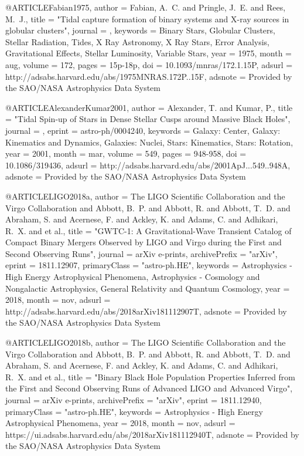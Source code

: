 \documentclass[twocolumn,tighten]{aastex63}
\begin{document}
{{{{@ARTICLE{Fabian1975,
   author = {{Fabian}, A.~C. and {Pringle}, J.~E. and {Rees}, M.~J.},
    title = "{Tidal capture formation of binary systems and X-ray sources in globular clusters}",
  journal = {\mnras},
 keywords = {Binary Stars, Globular Clusters, Stellar Radiation, Tides, X Ray Astronomy, X Ray Stars, Error Analysis, Gravitational Effects, Stellar Luminosity, Variable Stars},
     year = 1975,
    month = aug,
   volume = 172,
    pages = {15p-18p},
      doi = {10.1093/mnras/172.1.15P},
   adsurl = {http://adsabs.harvard.edu/abs/1975MNRAS.172P..15F},
  adsnote = {Provided by the SAO/NASA Astrophysics Data System}
}

@ARTICLE{AlexanderKumar2001,
   author = {{Alexander}, T. and {Kumar}, P.},
    title = "{Tidal Spin-up of Stars in Dense Stellar Cusps around Massive Black Holes}",
  journal = {\apj},
   eprint = {astro-ph/0004240},
 keywords = {Galaxy: Center, Galaxy: Kinematics and Dynamics, Galaxies: Nuclei, Stars: Kinematics, Stars: Rotation},
     year = 2001,
    month = mar,
   volume = 549,
    pages = {948-958},
      doi = {10.1086/319436},
   adsurl = {http://adsabs.harvard.edu/abs/2001ApJ...549..948A},
  adsnote = {Provided by the SAO/NASA Astrophysics Data System}
}

@ARTICLE{LIGO2018a,
   author = {{The LIGO Scientific Collaboration} and {the Virgo Collaboration} and 
	{Abbott}, B.~P. and {Abbott}, R. and {Abbott}, T.~D. and {Abraham}, S. and 
	{Acernese}, F. and {Ackley}, K. and {Adams}, C. and {Adhikari}, R.~X. and et al.},
    title = "{GWTC-1: A Gravitational-Wave Transient Catalog of Compact Binary Mergers Observed by LIGO and Virgo during the First and Second Observing Runs}",
  journal = {arXiv e-prints},
archivePrefix = "arXiv",
   eprint = {1811.12907},
 primaryClass = "astro-ph.HE",
 keywords = {Astrophysics - High Energy Astrophysical Phenomena, Astrophysics - Cosmology and Nongalactic Astrophysics, General Relativity and Quantum Cosmology},
     year = 2018,
    month = nov,
   adsurl = {http://adsabs.harvard.edu/abs/2018arXiv181112907T},
  adsnote = {Provided by the SAO/NASA Astrophysics Data System}
}

@ARTICLE{LIGO2018b,
   author = {{The LIGO Scientific Collaboration} and {the Virgo Collaboration} and 
	{Abbott}, B.~P. and {Abbott}, R. and {Abbott}, T.~D. and {Abraham}, S. and 
	{Acernese}, F. and {Ackley}, K. and {Adams}, C. and {Adhikari}, R.~X. and et al.},
    title = "{Binary Black Hole Population Properties Inferred from the First and Second Observing Runs of Advanced LIGO and Advanced Virgo}",
  journal = {arXiv e-prints},
archivePrefix = "arXiv",
   eprint = {1811.12940},
 primaryClass = "astro-ph.HE",
 keywords = {Astrophysics - High Energy Astrophysical Phenomena},
     year = 2018,
    month = nov,
   adsurl = {https://ui.adsabs.harvard.edu/abs/2018arXiv181112940T},
  adsnote = {Provided by the SAO/NASA Astrophysics Data System}
}

}}}}
\end{document}
